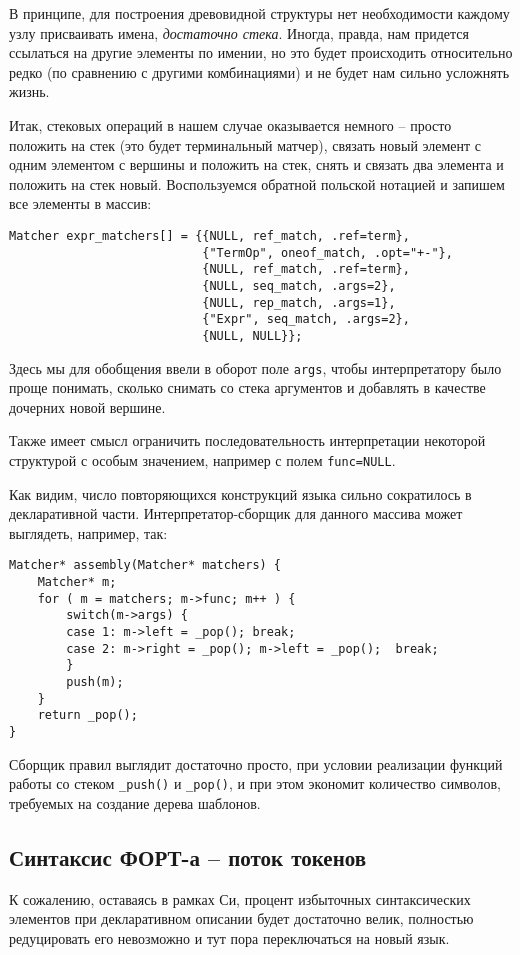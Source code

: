 \documentclass[10pt]{report}
\begin{document}
В принципе, для построения древовидной структуры нет необходимости каждому узлу присваивать имена,  \emph{достаточно стека}.
Иногда, правда, нам придется ссылаться на другие элементы по имении, но это будет происходить относительно редко (по сравнению с другими комбинациями) и не будет нам сильно усложнять жизнь.

Итак, стековых операций в нашем случае оказывается немного -- просто положить на стек (это будет терминальный матчер), связать новый элемент с одним элементом с вершины и положить на стек, снять и связать два элемента и положить на стек новый. Воспользуемся обратной польской нотацией и запишем все элементы в массив:
\begin{lstlisting}[caption=Массив матчеров, label=lst:matchers-array]
Matcher expr_matchers[] = {{NULL, ref_match, .ref=term},
						   {"TermOp", oneof_match, .opt="+-"},
						   {NULL, ref_match, .ref=term},
						   {NULL, seq_match, .args=2}, 
						   {NULL, rep_match, .args=1},
						   {"Expr", seq_match, .args=2},
						   {NULL, NULL}};
\end{lstlisting}
Здесь мы для обобщения ввели в оборот поле \texttt{args}, чтобы интерпретатору было проще понимать, сколько снимать со стека аргументов и добавлять в качестве дочерних новой вершине.

Также имеет смысл ограничить последовательность интерпретации некоторой структурой с особым значением, например с полем {\tt func=NULL}.

Как видим, число повторяющихся конструкций языка сильно сократилось в декларативной части.
Интерпретатор-сборщик для данного массива может выглядеть, например, так:
\begin{lstlisting}[caption=Пример сборщика из массива, label=lst:assembler-sample]
Matcher* assembly(Matcher* matchers) {
	Matcher* m;
	for ( m = matchers; m->func; m++ ) {
		switch(m->args) {
		case 1: m->left = _pop(); break;
		case 2: m->right = _pop(); m->left = _pop();  break;
		}
		push(m);
	}
	return _pop();
}
\end{lstlisting}
Сборщик правил выглядит достаточно просто, при условии реализации функций работы со стеком {\tt \_push()} и {\tt \_pop()}, и при этом экономит количество символов, требуемых на создание дерева шаблонов.

\subsection{Синтаксис ФОРТ-а -- поток токенов}
К сожалению, оставаясь в рамках Си, процент избыточных синтаксических элементов при декларативном описании будет достаточно велик, полностью редуцировать его невозможно и тут пора переключаться на новый язык.
\end{document}
